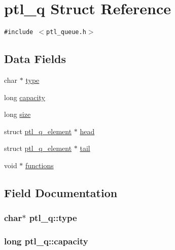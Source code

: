 \hypertarget{structptl__q}{
\section{ptl\_\-q Struct Reference}
\label{structptl__q}
}
{\tt \#include $<$ptl\_\-queue.h$>$}

\subsection*{Data Fields}
\begin{CompactItemize}
\item 
char $\ast$ \hyperlink{structptl__q_2cc9c2fed77707edcd1ad100b77ae518}{type}
\item 
long \hyperlink{structptl__q_048809b1b71c2eb8761efc257e5b33e7}{capacity}
\item 
long \hyperlink{structptl__q_3f0431c19a769ad9b217fd4346be9d7a}{size}
\item 
struct \hyperlink{structptl__q__element}{ptl\_\-q\_\-element} $\ast$ \hyperlink{structptl__q_621b56b8f7c05e525fd57d9df6e4da98}{head}
\item 
struct \hyperlink{structptl__q__element}{ptl\_\-q\_\-element} $\ast$ \hyperlink{structptl__q_1e1123cd870ec27fa4bfd60b1bee30da}{tail}
\item 
void $\ast$ \hyperlink{structptl__q_220328a94e311f641635b33ac2d9bfca}{functions}
\end{CompactItemize}


\subsection{Field Documentation}
\hypertarget{structptl__q_2cc9c2fed77707edcd1ad100b77ae518}{
\subsubsection{\setlength{\rightskip}{0pt plus 5cm}char$\ast$ {\bf ptl\_\-q::type}}}
\label{structptl__q_2cc9c2fed77707edcd1ad100b77ae518}


\hypertarget{structptl__q_048809b1b71c2eb8761efc257e5b33e7}{
\subsubsection{\setlength{\rightskip}{0pt plus 5cm}long {\bf ptl\_\-q::capacity}}}
\label{structptl__q_048809b1b71c2eb8761efc257e5b33e7}


